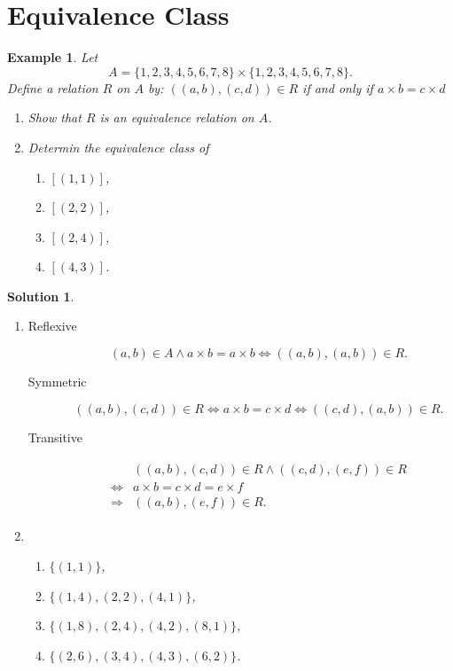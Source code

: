 \documentclass{../../cls/sig-alternate-05-2015}
\newtheorem{example}{Example}
\newtheorem*{solution*}{Solution}
\begin{document}
\section{Equivalence Class}
\begin{example}
	Let \begin{equation}
		A = \{1, 2, 3, 4, 5, 6, 7, 8\} \times \{1, 2, 3, 4, 5, 6, 7, 8\}.
	\end{equation} Define a relation $R$ on $A$ by: $((a, b), (c, d)) \in R$ if and only if $a \times b = c \times d$ \begin{enumerate}[label=(\alph*)]
		\item Show that $R$ is an equivalence relation on $A$.
		\item Determin the equivalence class of \begin{enumerate}[label=(\roman*)]
			\item $[(1, 1)]$,
			\item $[(2, 2)]$,
			\item $[(2, 4)]$,
			\item $[(4, 3)]$.
		\end{enumerate}
	\end{enumerate}
\end{example}
\begin{solution*}
	\begin{enumerate}[label=(\alph*)]
		\item \begin{description}
			\item[Reflexive] \begin{equation}
				(a, b) \in A \land a \times b = a \times b \Leftrightarrow ((a, b), (a, b)) \in R.
			\end{equation}
			\item[Symmetric] \begin{equation}
				((a, b), (c, d)) \in R \Leftrightarrow a \times b = c \times d \Leftrightarrow ((c, d), (a, b)) \in R.
			\end{equation}
			\item[Transitive] \begin{align}
				\begin{aligned}
				& ((a, b), (c, d)) \in R \land ((c, d), (e, f)) \in R\\
				\Leftrightarrow & a \times b = c \times d = e \times f\\
				\Rightarrow & ((a, b), (e, f)) \in R.
				\end{aligned}
			\end{align}
		\end{description}
		\item \begin{enumerate}[label=(\roman*)]
			\item $\{(1, 1)\}$,
			\item $\{(1, 4), (2, 2), (4, 1)\}$,
			\item $\{(1, 8), (2, 4), (4, 2), (8, 1)\}$,
			\item $\{(2, 6), (3, 4), (4, 3), (6, 2)\}$.
		\end{enumerate}
	\end{enumerate}
\end{solution*}
\end{document}
